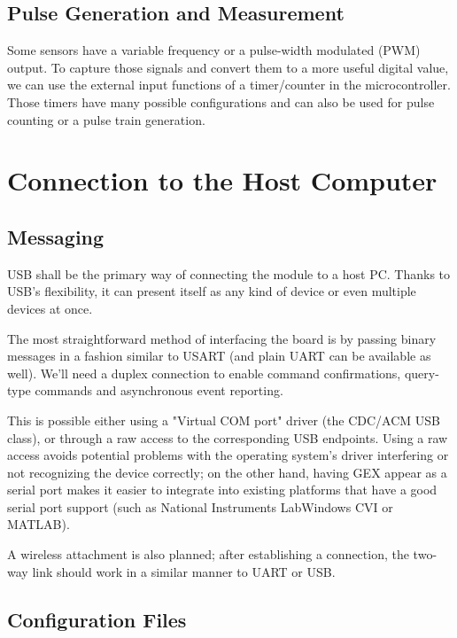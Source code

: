 \subsection{Pulse Generation and Measurement}

Some sensors have a variable frequency or a pulse-width modulated (PWM) output. To capture those signals and convert them to a more useful digital value, we can use the external input functions of a timer/counter in the microcontroller. Those timers have many possible configurations and can also be used for pulse counting or a pulse train generation.

\section{Connection to the Host Computer}

\subsection{Messaging}

USB shall be the primary way of connecting the module to a host PC. Thanks to USB's flexibility, it can present itself as any kind of device or even multiple devices at once.

The most straightforward method of interfacing the board is by passing binary messages in a fashion similar to USART (and plain UART can be available as well). We'll need a duplex connection to enable command confirmations, query-type commands and asynchronous event reporting.

This is possible either using a "Virtual COM port" driver (the CDC/ACM USB class), or through a raw access to the corresponding USB endpoints. Using a raw access avoids potential problems with the operating system's driver interfering or not recognizing the device correctly; on the other hand, having GEX appear as a serial port makes it easier to integrate into existing platforms that have a good serial port support (such as National Instruments LabWindows CVI or MATLAB).

A wireless attachment is also planned; after establishing a connection, the two-way link should work in a similar manner to UART or USB. 

\subsection{Configuration Files}


